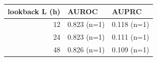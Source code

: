 \begin{tabular}{rll}
\toprule
lookback L (h) & AUROC & AUPRC \\
\midrule
12 & 0.823 (n=1) & 0.118 (n=1) \\
24 & 0.823 (n=1) & 0.111 (n=1) \\
48 & 0.826 (n=1) & 0.109 (n=1) \\
\bottomrule
\end{tabular}

